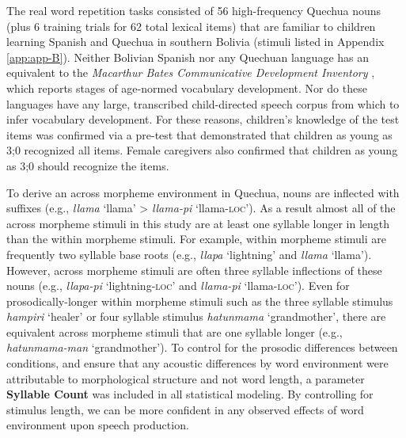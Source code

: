\documentclass[a4paper,man,floatsintext,natbib,donotrepeattitle, apacite]{apa6}
\begin{document}
The real word repetition tasks consisted of 56 high-frequency Quechua nouns (plus 6 training trials for 62 total lexical items) that are familiar to children learning Spanish and Quechua in southern Bolivia (stimuli listed in Appendix \ref{app:app-B}). Neither Bolivian Spanish nor any Quechuan language has an equivalent to the \textit{Macarthur Bates Communicative Development Inventory} \citep{fensonMacArthurBatesCommunicativeDevelopment2007}, which reports stages of age-normed vocabulary development. Nor do these languages have any large, transcribed child-directed speech corpus from which to infer vocabulary development. For these reasons, children’s knowledge of the test items was confirmed via a pre-test that demonstrated that children as young as 3;0 recognized all items. Female caregivers also confirmed that children as young as 3;0 should recognize the items. 

To derive an across morpheme environment in Quechua, nouns are inflected with suffixes (e.g., \textit{llama} `llama' > \textit{llama-pi} `llama-\textsc{loc}'). As a result almost all of the across morpheme stimuli in this study are at least one syllable longer in length than the within morpheme stimuli. For example, within morpheme stimuli are frequently two syllable base roots (e.g., \textit{llapa} `lightning' and \textit{llama} `llama'). However, across morpheme stimuli are often three syllable inflections of these nouns (e.g., \textit{llapa-pi} `lightning-\textsc{loc}' and \textit{llama-pi} `llama-\textsc{loc}'). Even for prosodically-longer within morpheme stimuli such as the three syllable stimulus \textit{hampiri} `healer' or four syllable stimulus \textit{hatunmama} `grandmother', there are equivalent across morpheme stimuli that are one syllable longer (e.g., \textit{hatunmama-man} `grandmother'). To control for the prosodic differences between conditions, and ensure that any acoustic differences by word environment were attributable to morphological structure and not word length, a parameter \textbf{Syllable Count} was included in all statistical modeling. By controlling for stimulus length, we can be more confident in any observed effects of word environment upon speech production. 
\end{document}
